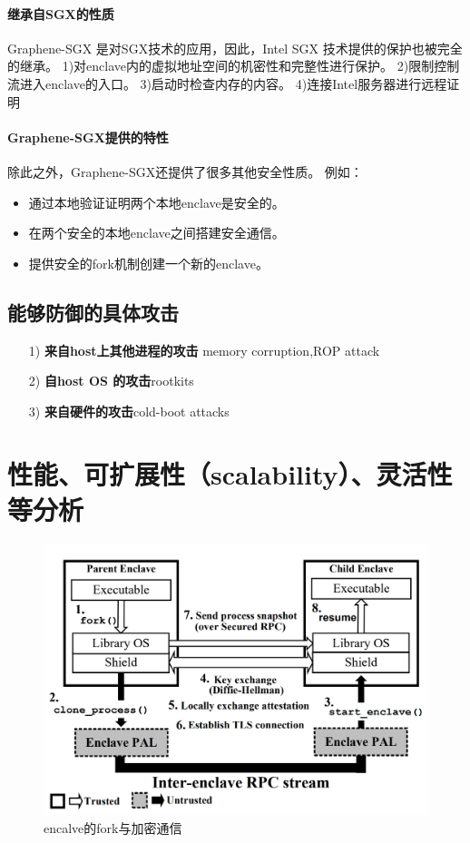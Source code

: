 \paragraph{继承自SGX的性质}
Graphene-SGX 是对SGX技术的应用，因此，Intel SGX 技术提供的保护也被完全的继承。
1)对enclave内的虚拟地址空间的机密性和完整性进行保护。
2)限制控制流进入enclave的入口。
3)启动时检查内存的内容。
4)连接Intel服务器进行远程证明

\paragraph{Graphene-SGX提供的特性}
除此之外，Graphene-SGX还提供了很多其他安全性质。
例如：
\begin{itemize}
    \item 通过本地验证证明两个本地enclave是安全的。
    \item 在两个安全的本地enclave之间搭建安全通信。
    \item 提供安全的fork机制创建一个新的enclave。
\end{itemize}

\subsection{能够防御的具体攻击}
\begin{itemize}
    \item [1)]\textbf{来自host上其他进程的攻击} memory corruption,ROP attack
    \item [2)]\textbf{自host OS 的攻击}rootkits
    \item [3)]\textbf{来自硬件的攻击}cold-boot attacks
\end{itemize}

\section{性能、可扩展性（scalability）、灵活性等分析}
\begin{figure}
    \centering
    \includegraphics[scale=0.35]{Figures/SGX/enclavescale.png}
    \decoRule
    \caption{encalve的fork与加密通信}
    \label{fig:enclavescale}
\end{figure}
